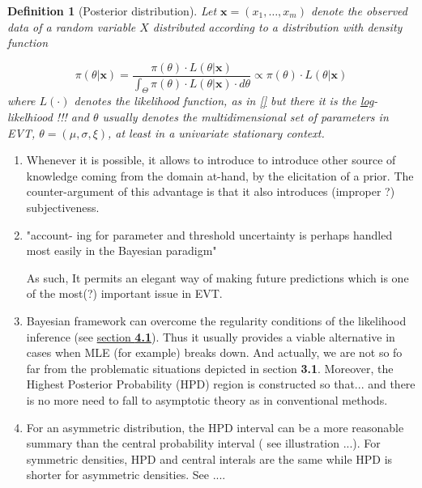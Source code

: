 \documentclass[11pt,a4paper,openany ]{book}
\newtheorem{definition}{Definition}[chapter]
\begin{document}
\begin{definition}[Posterior distribution]
	Let $\boldsymbol{x}=(x_1,\dots,x_m)$
	denote the observed data of a random variable $X$ distributed according to a distribution with density function 
	
	
	\begin{equation}\label{bayeseq}
	\pi (\theta|\boldsymbol{x})=\frac{\pi(\theta)\cdot L(\theta|\boldsymbol{x})}{\int_{\Theta} 
		\pi(\theta)\cdot L(\theta|\boldsymbol{x}) \cdot d\theta}\propto \pi(\theta)\cdot 
	L(\theta|\boldsymbol{x})
	\end{equation}
	where $L(\cdot)$ denotes the likelihood function, as in \ref{} but there it is the \underline{log}-likelhiood !!!
	and $\theta$ usually denotes the multidimensional set of parameters in EVT, $\theta=(\mu,\sigma,\xi)$, at least in a univariate stationary context.
\end{definition}

\begin{enumerate}
	
	\item Whenever it is possible, it allows to introduce to introduce other source of knowledge coming from the domain at-hand, by the elicitation of a prior.  The counter-argument of this advantage is that it also introduces (improper ?) subjectiveness.
	\item\label{it2bayes} "account-
	ing for parameter and threshold uncertainty is perhaps handled most easily in the
	Bayesian paradigm" \cite[pp.106]{dey_extreme_2016}
	
	As such, It permits an elegant way of making future predictions  which is one of the most(?) important issue in EVT.
	
	\item Bayesian framework can overcome the regularity conditions of the likelihood inference
	(see \hyperref[likintro]{section \textbf{4.1}}).
	Thus it usually provides a viable alternative in cases when MLE (for example) breaks down. And actually, we are not so fo far from the problematic situations depicted in section \textbf{3.1}. 
	Moreover, the Highest Posterior Probability (HPD) region is constructed so that... and there is no more need to fall to asymptotic theory as in conventional methods.
	
	
	\item For an asymmetric distribution,
	the HPD interval can be a more reasonable summary than the central probability
	interval ( see illustration ...). For symmetric densities, HPD and central interals are the same while HPD is shorter for asymmetric densities.
	See \citet{liu_simulation-efficient_2015}....
	
\end{enumerate}
\end{document}
